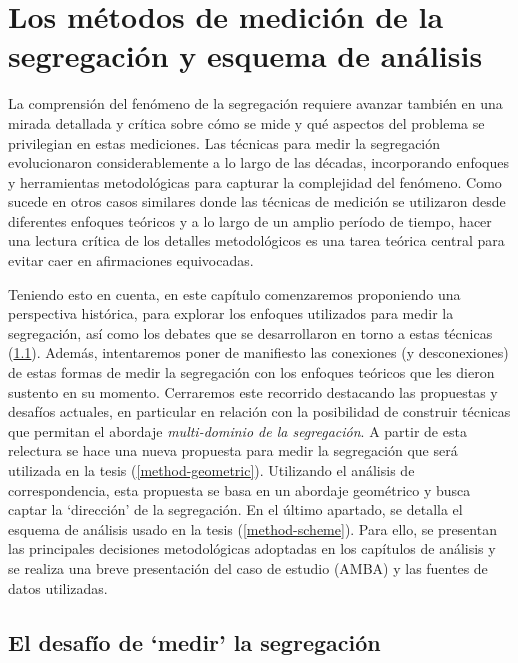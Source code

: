 \documentclass[
  spanish,
  a4paper,%
  chapterprefix=true,%
  DIV=calc,%
  twoside]{scrbook}%
\begin{document}
\chapter{Los métodos de medición de la segregación y esquema de análisis}\label{method}

La comprensión del fenómeno de la segregación requiere avanzar también
en una mirada detallada y crítica sobre cómo se mide y qué aspectos del
problema se privilegian en estas mediciones. Las técnicas para medir la
segregación evolucionaron considerablemente a lo largo de las décadas,
incorporando enfoques y herramientas metodológicas para capturar la
complejidad del fenómeno. Como sucede en otros casos similares donde las
técnicas de medición se utilizaron desde diferentes enfoques teóricos y
a lo largo de un amplio período de tiempo, hacer una lectura crítica de
los detalles metodológicos es una tarea teórica central para evitar caer
en afirmaciones equivocadas.

Teniendo esto en cuenta, en este
capítulo comenzaremos proponiendo una perspectiva histórica, para
explorar los enfoques utilizados para medir la segregación, así como los
debates que se desarrollaron en torno a estas técnicas
(\ref{method-history}). Además, intentaremos poner de manifiesto las
conexiones (y desconexiones) de estas formas de medir la segregación con
los enfoques teóricos que les dieron sustento en su momento. Cerraremos
este recorrido destacando las propuestas y desafíos actuales, en
particular en relación con la posibilidad de construir técnicas que
permitan el abordaje \emph{multi-dominio de la segregación}. A partir de esta
relectura se hace una nueva propuesta para medir la segregación que será
utilizada en la tesis (\ref{method-geometric}). Utilizando el análisis
de correspondencia, esta propuesta se basa en un abordaje geométrico y
busca captar la `dirección' de la segregación. En el último apartado, se
detalla el esquema de análisis usado en la tesis (\ref{method-scheme}).
Para ello, se presentan las principales decisiones metodológicas
adoptadas en los capítulos de análisis y se realiza una breve
presentación del caso de estudio (AMBA) y las fuentes de datos
utilizadas.

\section{El desafío de `medir' la segregación}\label{method-history}
\end{document}
